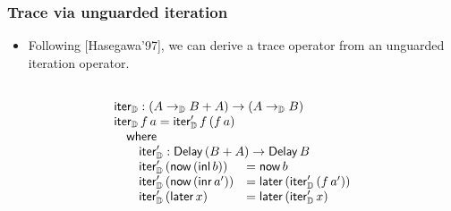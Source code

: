 \documentclass[12pt,t]{beamer}
\newcommand{\C}{\mathbb{C}}
\newcommand{\copair}[2]{[#1,#2]}
\newcommand{\inl}{\mathsf{inl}}
\newcommand{\inr}{\mathsf{inr}}
\newcommand{\iter}{\mathsf{iter}}
\newcommand{\id}{\mathsf{id}}
\newcommand{\Delay}{\ensuremath{\mathsf{Delay}\,}}
\newcommand{\now}{\mathsf{now}}
\newcommand{\later}{\mathsf{later}}
\newcommand{\D}{\mathbb{D}}
\newcommand{\Dapprox}{\mathbb{D}_{\approx}}
\newcommand{\iterD}{\mathsf{iter}_\D}
\begin{document}
\begin{frame}

  \frametitle{Trace via unguarded iteration}

  \begin{itemize}

  \item Following [Hasegawa'97], we can derive a trace operator from
    an unguarded iteration operator.
  \end{itemize}
  \[
  \begin{array}{llll} \\
    \multicolumn{4}{l}{\iterD : (A \to_\D B + A) \to (A \to_\D B)} \\
    \multicolumn{4}{l}{\iterD \,f \,a = \iterD' \,f \,(f \,a)} \\
    & \multicolumn{3}{l}{\mathsf{where}} \\
    & & \multicolumn{2}{l}{\iterD' : \Delay (B + A) \to \Delay B} \\
    & & \iterD' \,(\now \,(\inl\, b)) & = \now \,b \\
    & & \iterD' \,(\now \,(\inr\, a')) & = \later\,(\iterD'\,(f \,a')) \\ 
    & & \iterD' \,(\later \,x) & = \later \,(\iterD' \,x)    
  \end{array}
  \]
    

\end{frame}
\end{document}
